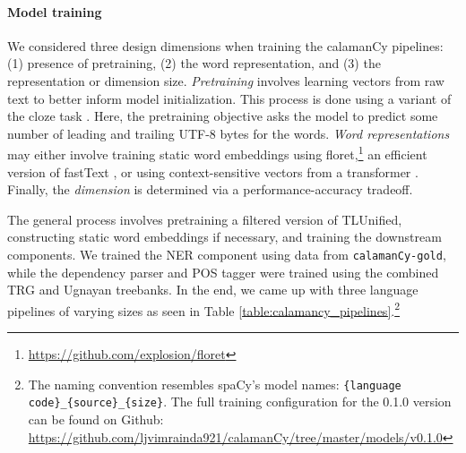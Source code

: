 \documentclass[11pt]{article}
\begin{document}
\paragraph*{Model training}

We considered three design dimensions when training the calamanCy pipelines: (1) presence of pretraining, (2) the word representation, and (3) the representation or dimension size.
\textit{Pretraining} involves learning vectors from raw text to better inform model initialization.
This process is done using a variant of the cloze task \citep{Devlin2019BERTPO}.
Here, the pretraining objective asks the model to predict some number of leading and trailing UTF-8 bytes for the words.
\textit{Word representations} may either involve training static word embeddings using floret,\footnote[3]{\url{https://github.com/explosion/floret}} an efficient version of fastText \citep{Bojanowski2016EnrichingWV}, or using context-sensitive vectors from a transformer \citep{Vaswani2017AttentionIA}.
Finally, the \textit{dimension} is determined via a performance-accuracy tradeoff.


The general process involves pretraining a filtered version of TLUnified, constructing static word embeddings if necessary, and training the downstream components.
We trained the NER component using data from \texttt{calamanCy-gold}, while the dependency parser and POS tagger were trained using the combined TRG and Ugnayan treebanks.
In the end, we came up with three language pipelines of varying sizes as seen in Table \ref{table:calamancy_pipelines}.\footnote[4]{
  The naming convention resembles spaCy's model names: \texttt{\{language code\}\_\{source\}\_\{size\}}. 
  The full training configuration for the 0.1.0 version can be found on Github: \url{https://github.com/ljvimrainda921/calamanCy/tree/master/models/v0.1.0}
}

\end{document}
